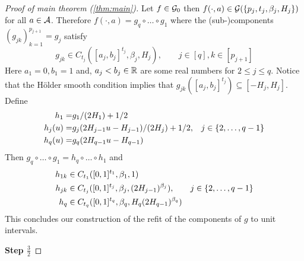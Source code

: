 \begin{proof}[Proof of main theorem (\ref{thm:main})]
  Let $f \in \mathcal{G}_0$ then $f(\cdot, a) \in
  \mathcal{G}(\{p_j, t_j, \beta_j, H_j\})$ for all $a \in \mathcal{A}$.
  Therefore $f(\cdot, a) = g_q \circ \dots \circ g_1$ where
  the (sub-)components $(g_{jk})_{k=1}^{p_{j+1}} = g_j$ satisfy
  \begin{equation}
    g_{jk} \in C_{t_j}([a_j, b_j]^{t_j}, \beta_j, H_j)
    , \qquad j \in [q], k \in [p_{j+1}]
  \end{equation}
  Here $a_1 = 0, b_1=1$ and,
  $a_j < b_j \in \mathbb{R}$ are some real numbers for $2 \leq j \leq q$.
  Notice that the Hölder smooth condition implies that
  $g_{jk}([a_j, b_j]^{t_j}) \subseteq [-H_j, H_j]$.
  Define
  \begin{align}
    h_1 = & g_1/(2H_1) + 1/2 \notag
    \\ h_j(u) = & g_j(2H_{j-1} u - H_{j-1})/(2H_j) + 1/2,
    & j \in \{2, \dots, q-1\} \notag
    \\ h_q(u) = & g_q(2H_{q-1}u - H_{q-1})
  \end{align}
  Then $g_q \circ \dots \circ g_1 = h_q \circ \dots \circ h_1$ and
  \begin{align}
    h_{1k} \in &\; C_{t_1}([0,1]^{t_1}, \beta_1, 1) \notag
    \\ h_{jk} \in &\; C_{t_j}([0,1]^{t_j}, \beta_j, (2H_{j-1})^{\beta_j}),
    & j \in \{2, \dots, q-1\} \notag
    \\ h_q \in &\; C_{t_q}([0,1]^{t_q}, \beta_q, H_q(2H_{q-1})^{\beta_q})
  \end{align}
  This concludes our construction of the refit of the components of $g$
  to unit intervals.

  \textbf{Step $\frac{3}{2}$}


\end{proof}
